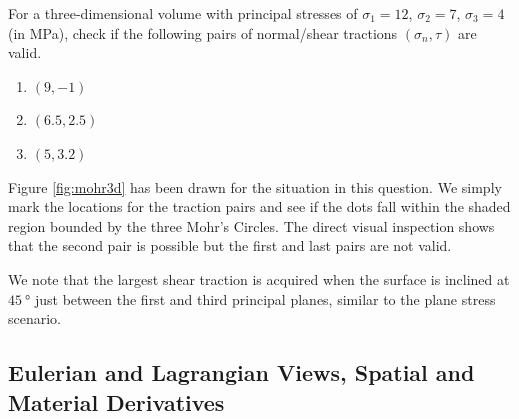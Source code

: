 \begin{exmp}
\label{exmp:mohr3d}
For a three-dimensional volume with principal stresses of $\sigma_1 = 12$, $\sigma_2 = 7$, $\sigma_3 = 4$ (in MPa), check if the following pairs of normal/shear tractions $(\sigma_n, \tau)$ are valid.
\begin{enumerate}[label=(\alph*)]
    \item $(9,-1)$
    \item $(6.5,2.5)$
    \item $(5,3.2)$
\end{enumerate}
\end{exmp}
\begin{solution}
Figure \ref{fig:mohr3d} has been drawn for the situation in this question. We simply mark the locations for the traction pairs and see if the dots fall within the shaded region bounded by the three Mohr's Circles. The direct visual inspection shows that the second pair is possible but the first and last pairs are not valid.
\end{solution}
We note that the largest shear traction is acquired when the surface is inclined at $\SI{45}{\degree}$ just between the first and third principal planes, similar to the plane stress scenario.

\subsection{Eulerian and Lagrangian Views, Spatial and Material Derivatives}

